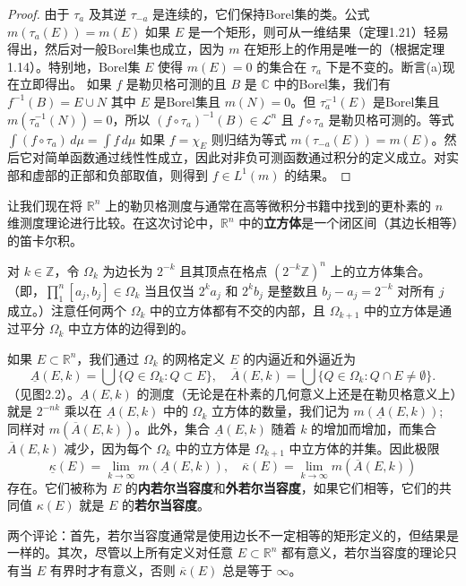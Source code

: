 \documentclass[lang=cn,10pt,thmcnt=section]{elegantbook}
\begin{document}
\begin{proof}
由于 $\tau_a$ 及其逆 $\tau_{-a}$ 是连续的，它们保持Borel集的类。公式 $m(\tau_a(E)) = m(E)$ 如果 $E$ 是一个矩形，则可从一维结果（定理1.21）轻易得出，然后对一般Borel集也成立，因为 $m$ 在矩形上的作用是唯一的（根据定理1.14）。特别地，Borel集 $E$ 使得 $m(E)=0$ 的集合在 $\tau_a$ 下是不变的。断言(a)现在立即得出。
如果 $f$ 是勒贝格可测的且 $B$ 是 $\mathbb{C}$ 中的Borel集，我们有 $f^{-1}(B) = E \cup N$ 其中 $E$ 是Borel集且 $m(N)=0$。但 $\tau_a^{-1}(E)$ 是Borel集且 $m(\tau_a^{-1}(N))=0$，所以 $(f \circ \tau_a)^{-1}(B) \in \mathcal{L}^n$ 且 $f \circ \tau_a$ 是勒贝格可测的。等式 $\int (f \circ \tau_a) \,d\mu = \int f \,d\mu$ 如果 $f = \chi_E$ 则归结为等式 $m(\tau_{-a}(E)) = m(E)$。然后它对简单函数通过线性性成立，因此对非负可测函数通过积分的定义成立。对实部和虚部的正部和负部取值，则得到 $f \in L^1(m)$ 的结果。
\end{proof}

让我们现在将 $\mathbb{R}^n$ 上的勒贝格测度与通常在高等微积分书籍中找到的更朴素的 $n$ 维测度理论进行比较。在这次讨论中，$\mathbb{R}^n$ 中的\textbf{立方体}是一个闭区间（其边长相等）的笛卡尔积。

对 $k \in \mathbb{Z}$，令 $\Omega_k$ 为边长为 $2^{-k}$ 且其顶点在格点 $(2^{-k}\mathbb{Z})^n$ 上的立方体集合。（即，$\prod_1^n [a_j, b_j] \in \Omega_k$ 当且仅当 $2^k a_j$ 和 $2^k b_j$ 是整数且 $b_j - a_j = 2^{-k}$ 对所有 $j$ 成立。）注意任何两个 $\Omega_k$ 中的立方体都有不交的内部，且 $\Omega_{k+1}$ 中的立方体是通过平分 $\Omega_k$ 中立方体的边得到的。

如果 $E \subset \mathbb{R}^n$，我们通过 $\Omega_k$ 的网格定义 $E$ 的内逼近和外逼近为
\[ \underline{A}(E,k) = \bigcup\{Q \in \Omega_k : Q \subset E\}, \quad \overline{A}(E,k) = \bigcup\{Q \in \Omega_k : Q \cap E \neq \emptyset\}. \]
（见图2.2）。$\underline{A}(E,k)$ 的测度（无论是在朴素的几何意义上还是在勒贝格意义上）就是 $2^{-nk}$ 乘以在 $\underline{A}(E,k)$ 中的 $\Omega_k$ 立方体的数量，我们记为 $m(\underline{A}(E,k))$; 同样对 $m(\overline{A}(E,k))$。此外，集合 $\underline{A}(E,k)$ 随着 $k$ 的增加而增加，而集合 $\overline{A}(E,k)$ 减少，因为每个 $\Omega_k$ 中的立方体是 $\Omega_{k+1}$ 中立方体的并集。因此极限
\[ \underline{\kappa}(E) = \lim_{k\to\infty} m(\underline{A}(E,k)), \quad \overline{\kappa}(E) = \lim_{k\to\infty} m(\overline{A}(E,k)) \]
存在。它们被称为 $E$ 的\textbf{内若尔当容度}和\textbf{外若尔当容度}，如果它们相等，它们的共同值 $\kappa(E)$ 就是 $E$ 的\textbf{若尔当容度}。

两个评论：首先，若尔当容度通常是使用边长不一定相等的矩形定义的，但结果是一样的。其次，尽管以上所有定义对任意 $E \subset \mathbb{R}^n$ 都有意义，若尔当容度的理论只有当 $E$ 有界时才有意义，否则 $\overline{\kappa}(E)$ 总是等于 $\infty$。
\end{document}
